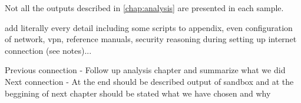 Not all the outputs described in \ref{chap:analysis} are presented in each sample.



add literally every detail including some scripts to appendix, even configuration of network, vpn, reference manuals, security reasoning during setting up internet connection (see notes)...





Previous connection
- Follow up analysis chapter and summarize what we did
Next connection
- At the end should be described output of sandbox and at the beggining of next chapter should be stated what we have chosen and why














